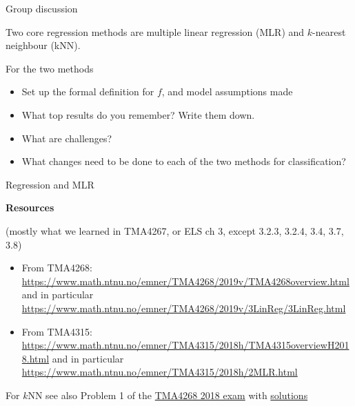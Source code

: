 \documentclass[
  ignorenonframetext,
]{beamer}
\providecommand{\tightlist}{%
  \setlength{\itemsep}{0pt}\setlength{\parskip}{0pt}}
\begin{document}
\begin{frame}

\begin{block}{Group discussion}

Two core regression methods are multiple linear regression (MLR) and
\(k\)-nearest neighbour (kNN).

For the two methods

\begin{itemize}
\tightlist
\item
  Set up the formal definition for \(f\), and model assumptions made
\item
  What top results do you remember? Write them down.
\item
  What are challenges?
\item
  What changes need to be done to each of the two methods for
  classification?
\end{itemize}

\end{block}

\end{frame}

\begin{frame}

\begin{block}{Regression and MLR}

\textbf{Resources}

(mostly what we learned in TMA4267, or ELS ch 3, except 3.2.3, 3.2.4,
3.4, 3.7, 3.8)

\begin{itemize}
\tightlist
\item
  From TMA4268:
  \url{https://www.math.ntnu.no/emner/TMA4268/2019v/TMA4268overview.html}
  and in particular
  \url{https://www.math.ntnu.no/emner/TMA4268/2019v/3LinReg/3LinReg.html}
\item
  From TMA4315:
  \url{https://www.math.ntnu.no/emner/TMA4315/2018h/TMA4315overviewH2018.html}
  and in particular
  \url{https://www.math.ntnu.no/emner/TMA4315/2018h/2MLR.html}
\end{itemize}

For \(k\)NN see also Problem 1 of the
\href{https://www.math.ntnu.no/emner/TMA4268/Exam/V2018e.pdf}{TMA4268
2018 exam} with
\href{https://www.math.ntnu.no/emner/TMA4268/Exam/e2018sol.pdf}{solutions}

\end{block}

\end{frame}
\end{document}
